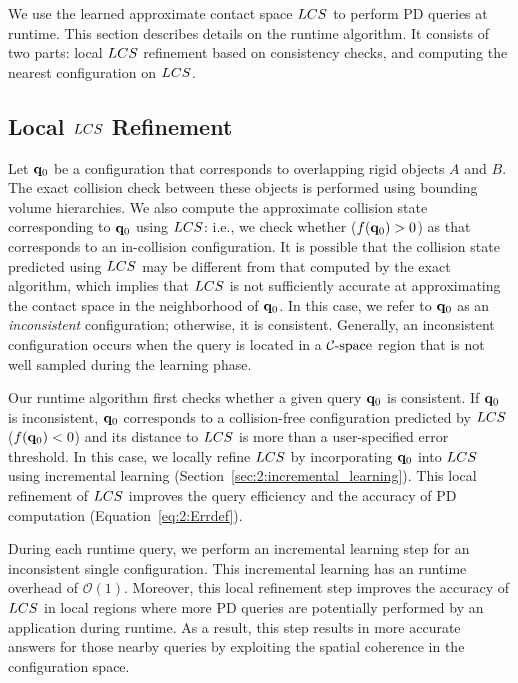 We use the learned approximate contact space $LCS$ to perform PD queries at
runtime. This section describes details on the runtime
algorithm. It consists of two parts: local $LCS$ refinement based on consistency checks, and
computing the nearest configuration on $LCS$.


\subsection{Local $LCS$ Refinement}
Let $\mathbf q_0$ be a configuration that corresponds to overlapping rigid objects $A$
and $B$. The exact collision check between these objects is performed using
bounding volume hierarchies. We also compute the approximate collision state corresponding to $\mathbf q_0$ using $LCS$: i.e., we
check whether ($f(\mathbf q_0)>0$) as that corresponds to an in-collision configuration.
It is possible that the collision state predicted
using $LCS$ may be different from that computed by the exact
algorithm, which implies that $LCS$ is not sufficiently
accurate at approximating the contact space in the neighborhood of $\mathbf q_0$.
In this case, we refer to $\mathbf q_0$ as an \emph{inconsistent} configuration;
otherwise, it is consistent.
Generally, an inconsistent configuration occurs when the query is located in
a $\mathcal C\text{-space}$ region that is not well sampled during the learning phase.

Our runtime algorithm first checks
whether a given query $\mathbf q_0$ is consistent. If $\mathbf q_0$ is inconsistent, $\mathbf q_0$ corresponds to a collision-free configuration
predicted by $LCS$ ($f(\mathbf q_0)<0$) and its distance to $LCS$ is
more than a user-specified error threshold. In this case, we locally refine
$LCS$ by incorporating $\mathbf q_0$ into $LCS$ using incremental learning (Section~\ref{sec:2:incremental_learning}).
This local refinement of $LCS$ improves the query efficiency and the accuracy of PD computation (Equation~\ref{eq:2:Errdef}).

During each runtime query, we perform an incremental learning step for an inconsistent
single configuration. This incremental learning has an runtime overhead of $\mathcal O(1)$.
Moreover, this local refinement step improves the accuracy of $LCS$ in local
regions where more PD queries are potentially performed by an application during runtime. 
As a result, this step results in more accurate answers for those nearby queries by exploiting the spatial coherence in the configuration space.

